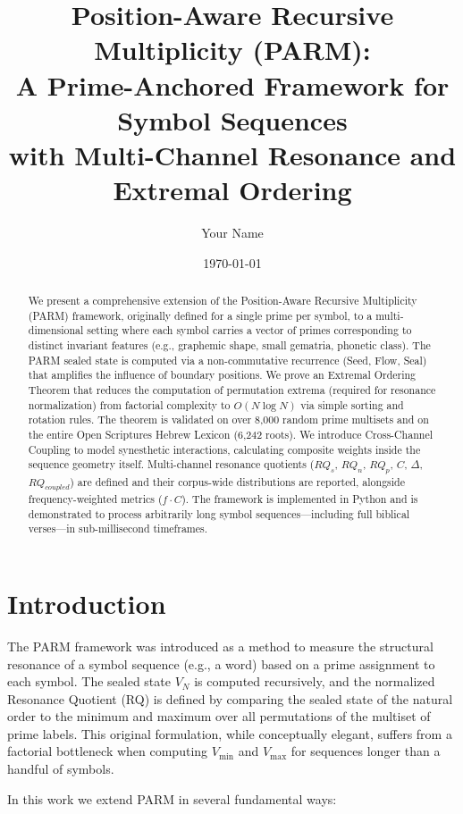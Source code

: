 \documentclass[12pt, a4paper]{article}
\title{Position-Aware Recursive Multiplicity (PARM):\\
  A Prime-Anchored Framework for Symbol Sequences\\
  with Multi-Channel Resonance and Extremal Ordering}
\author{Your Name}
\date{\today}
\begin{document}
\maketitle

\begin{abstract}
We present a comprehensive extension of the Position-Aware Recursive Multiplicity (PARM) framework, originally defined for a single prime per symbol, to a multi-dimensional setting where each symbol carries a vector of primes corresponding to distinct invariant features (e.g., graphemic shape, small gematria, phonetic class). The PARM sealed state is computed via a non-commutative recurrence (Seed, Flow, Seal) that amplifies the influence of boundary positions. We prove an Extremal Ordering Theorem that reduces the computation of permutation extrema (required for resonance normalization) from factorial complexity to $O(N \log N)$ via simple sorting and rotation rules. The theorem is validated on over 8,000 random prime multisets and on the entire Open Scriptures Hebrew Lexicon (6,242 roots). We introduce Cross-Channel Coupling to model synesthetic interactions, calculating composite weights inside the sequence geometry itself. Multi-channel resonance quotients ($RQ_s$, $RQ_n$, $RQ_p$, $C$, $\Delta$, $RQ_{coupled}$) are defined and their corpus-wide distributions are reported, alongside frequency-weighted metrics ($f \cdot C$). The framework is implemented in Python and is demonstrated to process arbitrarily long symbol sequences—including full biblical verses—in sub-millisecond timeframes.
\end{abstract}

\section{Introduction}

The PARM framework \cite{parm} was introduced as a method to measure the structural resonance of a symbol sequence (e.g., a word) based on a prime assignment to each symbol. The sealed state $V_N$ is computed recursively, and the normalized Resonance Quotient (RQ) is defined by comparing the sealed state of the natural order to the minimum and maximum over all permutations of the multiset of prime labels. This original formulation, while conceptually elegant, suffers from a factorial bottleneck when computing $V_{\min}$ and $V_{\max}$ for sequences longer than a handful of symbols.

In this work we extend PARM in several fundamental ways:
\end{document}
